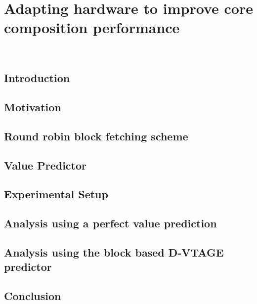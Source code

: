 \chapter{Adapting hardware to improve core composition performance}~\label{chp:hardchanges}

\section{Introduction}\label{sect:introduction-chapter3}

\section{Motivation}\label{sect:ch3-motivation}

\section{Round robin block fetching scheme}\label{chp3:sec:fetch}

\section{Value Predictor}
\label{chp3:sec:val}
\section{Experimental Setup}
\label{chp:chp3:sec:exp}
\section{Analysis using a perfect value prediction}
\label{chp:chp3:sec:analysis}
\section{Analysis using the block based D-VTAGE predictor}
\label{chp:chp3:sec:analysis2}
\section{Conclusion}

%
%